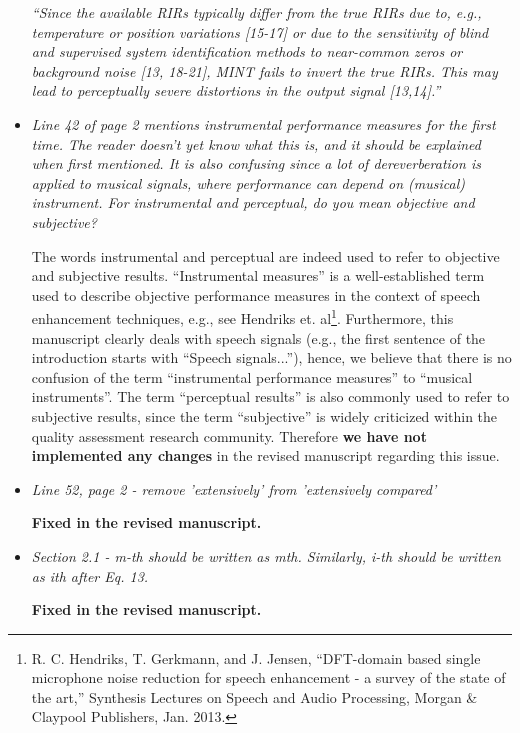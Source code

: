 \documentclass[10pt, a4paper]{article}
\begin{document}
\begin{itemize}
{\emph{``Since the available RIRs typically differ from the true RIRs due to, e.g., temperature or position variations [15-17] or due to the sensitivity of blind and supervised system identification methods to near-common zeros or background noise [13, 18-21], MINT fails to invert the true RIRs.
This may lead to perceptually severe distortions in the output signal [13,14].''}}

\item {\textit{Line 42  of page 2 mentions instrumental performance measures for the first time. The reader doesn't yet know what this is, and it should be explained when first mentioned. It is also confusing since a lot of dereverberation is applied to musical signals, where performance can depend on (musical) instrument. For instrumental and perceptual, do you mean objective and subjective?}}

The words instrumental and perceptual are indeed used to refer to objective and subjective results.
``Instrumental measures'' is a well-established term used to describe objective performance measures in the context of speech enhancement techniques, e.g., see Hendriks et. al\footnote{R. C. Hendriks, T. Gerkmann, and J. Jensen, “DFT-domain based single microphone noise reduction for speech enhancement - a survey of the state of the art,” Synthesis Lectures on Speech and Audio Processing, Morgan \& Claypool Publishers, Jan. 2013.}.
Furthermore, this manuscript clearly deals with speech signals (e.g., the first sentence of the introduction starts with ``Speech signals...''), hence, we believe that there is no confusion of the term ``instrumental performance measures'' to ``musical instruments''.
The term ``perceptual results'' is also commonly used to refer to subjective results, since the term ``subjective'' is widely criticized within the quality assessment research community.
Therefore {\textbf{we have not implemented any changes}} in the revised manuscript regarding this issue.


\item {\textit{Line 52, page 2 - remove 'extensively' from 'extensively compared'}}

{\textbf{Fixed in the revised manuscript.}}

\item {\textit{Section 2.1 - m-th should be written as mth. Similarly, i-th should be written as ith after Eq. 13.}}

{\textbf{Fixed in the revised manuscript.}}


\end{itemize}
\end{document}
